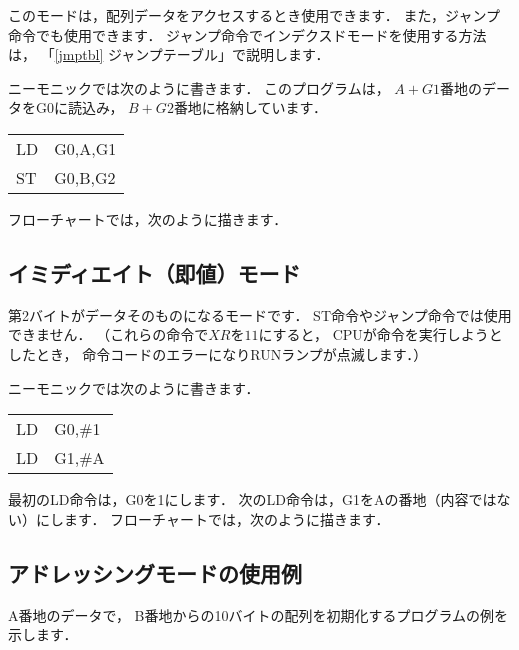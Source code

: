 このモードは，配列データをアクセスするとき使用できます．
また，ジャンプ命令でも使用できます．
ジャンプ命令でインデクスドモードを使用する方法は，
「\ref{jmptbl} ジャンプテーブル」で説明します．

ニーモニックでは次のように書きます．
このプログラムは，
$A+G1$番地のデータをG0に読込み，
$B+G2$番地に格納しています．

{\tt\begin{center}
\begin{tabular}{l l}
LD & G0,A,G1 \\
ST & G0,B,G2 \\
\end{tabular}
\end{center}}

フローチャートでは，次のように描きます．

\begin{center}
\end{center}

\subsection{イミディエイト（即値）モード}
第2バイトがデータそのものになるモードです．
ST命令やジャンプ命令では使用できません．
（これらの命令で$XR$を$11$にすると，
CPUが命令を実行しようとしたとき，
命令コードのエラーになりRUNランプが点滅します．）

ニーモニックでは次のように書きます．
{\tt\begin{center}
\begin{tabular}{l l}
LD & G0,\#1       \\
LD & G1,\#A       \\
\end{tabular}
\end{center}}

最初のLD命令は，G0を1にします．
次のLD命令は，G1をAの番地（内容ではない）にします．
フローチャートでは，次のように描きます．

\begin{center}
\end{center}

\subsection{アドレッシングモードの使用例}
A番地のデータで，
B番地からの10バイトの配列を初期化するプログラムの例を示します．

